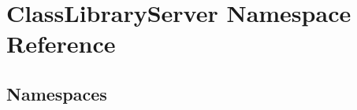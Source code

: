 \hypertarget{namespace_class_library_server}{}\section{Class\+Library\+Server Namespace Reference}
\label{namespace_class_library_server}
\subsection*{Namespaces}
\begin{DoxyCompactItemize}
\end{DoxyCompactItemize}
